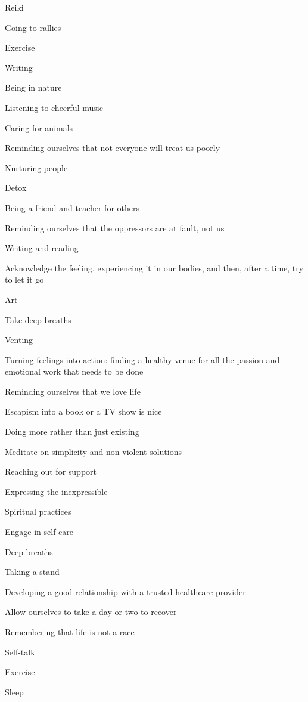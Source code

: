\begin{multicols}{2}
\begin{checkboxlist}
\item Reiki
\item Going to rallies
\item Exercise
\item Writing
\item Being in nature
\item Listening to cheerful music
\item Caring for animals
\item Reminding ourselves that not everyone will treat us poorly
\item Nurturing people
\item Detox
\item Being a friend and teacher for others
\item Reminding ourselves that the oppressors are at fault, not us
\item Writing and reading
\item Acknowledge the feeling, experiencing it in our bodies, and then, after a time, try to let it go
\item Art
\item Take deep breaths
\item Venting
\item Turning feelings into action: finding a healthy venue for all the passion and emotional work that needs to be done
\item Reminding ourselves that we love life
\item Escapism into a book or a TV show is nice
\item Doing more rather than just existing
\item Meditate on simplicity and non-violent solutions
\item Reaching out for support
\item Expressing the inexpressible
\item Spiritual practices
\item Engage in self care
\item Deep breaths
\item Taking a stand
\item Developing a good relationship with a trusted healthcare provider
\item Allow ourselves to take a day or two to recover
\item Remembering that life is not a race
\item Self-talk
\item Exercise
\item Sleep
\end{checkboxlist}
\end{multicols}

